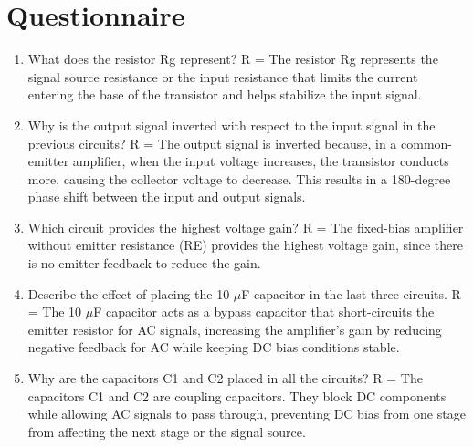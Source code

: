\newpage
\section{Questionnaire}
\begin{enumerate}
    \item What does the resistor Rg represent? R = The resistor Rg represents the signal source resistance or the input resistance that limits the current entering the base of the transistor and helps stabilize the input signal.
    \item Why is the output signal inverted with respect to the input signal in the previous circuits? R = The output signal is inverted because, in a common-emitter amplifier, when the input voltage increases, the transistor conducts more, causing the collector voltage to decrease. This results in a 180-degree phase shift between the input and output signals.
    \item Which circuit provides the highest voltage gain? R = The fixed-bias amplifier without emitter resistance (RE) provides the highest voltage gain, since there is no emitter feedback to reduce the gain.
    \item Describe the effect of placing the 10 $\mu$F capacitor in the last three circuits. R = The 10 $\mu$F capacitor acts as a bypass capacitor that short-circuits the emitter resistor for AC signals, increasing the amplifier's gain by reducing negative feedback for AC while keeping DC bias conditions stable.
    \item Why are the capacitors C1 and C2 placed in all the circuits? R = The capacitors C1 and C2 are coupling capacitors. They block DC components while allowing AC signals to pass through, preventing DC bias from one stage from affecting the next stage or the signal source.
\end{enumerate}